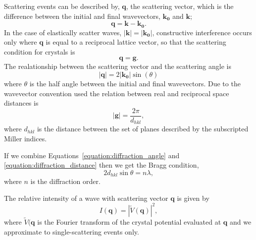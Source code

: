 Scattering events can be described by, $\mathbf{q}$, the scattering vector, which is the difference between the initial and final wavevectors, $\mathbf{k_0}$ and $\mathbf{k}$;
\begin{equation}
\mathbf{q} = \mathbf{k} - \mathbf{k_0}.
\end{equation}
In the case of elastically scatter waves, $|\mathbf{k}| = |\mathbf{k_0}|$, constructive interference occurs only where $\mathbf{q}$ is equal to a reciprocal lattice vector, so that the scattering condition for crystals is
\begin{equation}
\mathbf{q} = \mathbf{g}.
\end{equation}
The realationship between the scattering vector and the scattering angle is
\begin{equation}\label{equation:diffraction_angle}
\left|\mathbf{q}\right| = 2\left|\mathbf{k_0}\right|\sin(\theta)
\end{equation}
where $\theta$ is the half angle between the initial and final wavevectors.
Due to the wavevector convention used the relation between real and reciprocal space distances is
\begin{equation}\label{equation:diffraction_distance}
\left|\mathbf{g}\right| = \frac{2\pi}{d_{hkl}},
\end{equation}
where $d_{hkl}$ is the distance between the set of planes described by the subscripted Miller indices.

If we combine Equations~\ref{equation:diffraction_angle} and \ref{equation:diffraction_distance} then we get the Bragg condition,
\begin{equation}
2d_{hkl}\sin\theta = n\lambda,
\end{equation}
where $n$ is the diffraction order.

The relative intensity of a wave with scattering vector $\mathbf{q}$ is given by
\begin{equation}
I(\mathbf{q}) = \left|\tilde{V}(\mathbf{q})\right|^2,
\end{equation}
where $\tilde{V}(\mathbf{q}$ is the Fourier transform of the crystal potential evaluated at $\mathbf{q}$ and we approximate to single-scattering events only.

